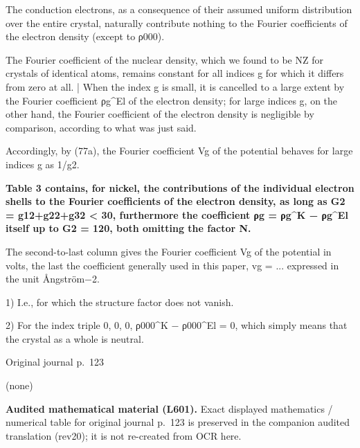 \documentclass[10pt]{article}
\newcommand{\origpage}[1]{\par\medskip\noindent\hfill{\small\color{notegray}Original journal p.~#1}\hfill\mbox{}\par\smallskip}
\newcommand{\mathref}[2]{\par\smallskip\noindent\colorbox{gray!8}{\parbox{0.95\linewidth}{\small\color{notegray}\textbf{Audited mathematical material (L#1).} Exact displayed mathematics / numerical table for original journal p.~#2 is preserved in the companion audited translation (rev20); it is not re-created from OCR here.}}\par\smallskip}
\begin{document}
The conduction electrons, as a consequence of their assumed uniform distribution over the entire crystal, naturally contribute nothing to the Fourier coefficients of the electron density (except to ρ000).\par
The Fourier coefficient of the nuclear density, which we found to be NZ for crystals of identical atoms, remains constant for all indices g for which it differs from zero at all. | When the index g is small, it is cancelled to a large extent by the Fourier coefficient ρg\textasciicircum{}El of the electron density; for large indices g, on the other hand, the Fourier coefficient of the electron density is negligible by comparison, according to what was just said.\par
Accordingly, by (77a), the Fourier coefficient Vg of the potential behaves for large indices g as 1/g2.\par
\noindent\textbf{Table 3 contains, for nickel, the contributions of the individual electron shells to the Fourier coefficients of the electron density, as long as G2 = g12+g22+g32 < 30, furthermore the coefficient ρg = ρg\textasciicircum{}K − ρg\textasciicircum{}El itself up to G2 = 120, both omitting the factor N.}\par
The second-to-last column gives the Fourier coefficient Vg of the potential in volts, the last the coefficient generally used in this paper, vg = ... expressed in the unit Ångström−2.\par
\noindent\footnotesize 1) I.e., for which the structure factor does not vanish.\par\normalsize
\noindent\footnotesize 2) For the index triple 0, 0, 0, ρ000\textasciicircum{}K − ρ000\textasciicircum{}El = 0, which simply means that the crystal as a whole is neutral.\par\normalsize
\origpage{123}
(none)\par
\mathref{601}{123}
\end{document}
